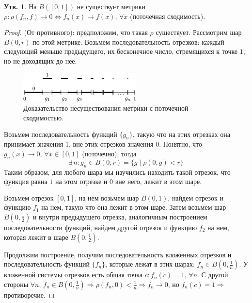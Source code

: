 \documentclass[12pt]{article}
\theoremstyle{definition}
\newtheorem{prop}{Утв.}
\begin{document}
\begin{prop}
	На $B([0,1])$ не существует метрики $\rho \colon \rho(f_n, f) \to 0 \Leftrightarrow f_n(x) \to f(x), \, \forall x$ (поточечная сходимость).
\end{prop}
\begin{proof}
	(От противного): предположим, что такая $\rho$ существует. Рассмотрим шар $B(0,r)$ по этой метрике. Возьмем последовательность отрезков: каждый следующий меньше предыдущего, их бесконечное число, стремящихся к точке $1$, но не доходящих до неё.
	\begin{figure}[H]
		\centering
		\includegraphics[width=0.55\textwidth]{5_3.eps}
		\caption{Доказательство несуществования метрики с поточечной сходимостью.}
		\label{5_3}
	\end{figure}
	Возьмем последовательность функций $\{g_n\}$, такую что на этих отрезках она принимает значения $1$, вне этих отрезков значения $0$. Понятно, что $g_n(x) \to 0, \, \forall x  \in [0,1]$ (поточечно), тогда 
	$$
		\exists \, n \colon g_n \in B(0,r) = \{g\mid \rho(0,g) < r\}
	$$
	Таким образом, для любого шара мы научились находить такой отрезок, что функция равна $1$ на этом отрезке и $0$ вне него, лежит в этом шаре.
	
	Возьмем отрезок $[0,1]$, на нем возьмем шар $B(0,1)$, найдем отрезок и функцию $f_1$ на нем, такую что она лежит в этом шаре. Затем возьмем шар $B(0,\frac{1}{2})$ и внутри предыдущего отрезка, аналогичным построением последовательности функций, найдем другой отрезок и функцию $f_2$ на нем, которая лежит в шаре $B(0,\frac{1}{2})$. 
	
	Продолжим построение, получим последовательность вложенных отрезков и последовательность функций $\{f_n\}$, которые лежат в этих шарах: $f_n \in B(0,\frac{1}{n})$. У вложенной системы отрезков есть общая точка $c \colon f_n(c) = 1, \, \forall n$. С другой стороны $\forall n, \, f_n \in B(0,\frac{1}{n}) \Rightarrow \rho(f_n, 0) < \frac{1}{n} \Rightarrow f_n \to 0$, но $f_n(c) = 1 \Rightarrow$ противоречие.
\end{proof}
\end{document}
